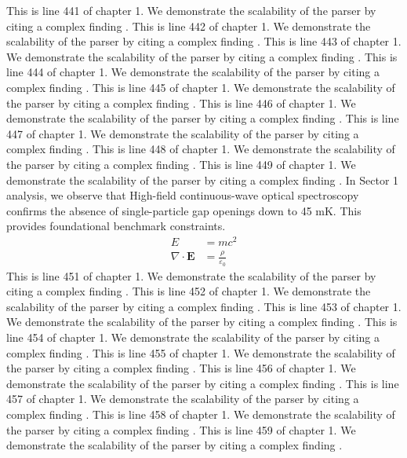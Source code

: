 This is line 441 of chapter 1. We demonstrate the scalability of the parser by citing a complex finding \cite{ref1_441}.
This is line 442 of chapter 1. We demonstrate the scalability of the parser by citing a complex finding \cite{ref1_442}.
This is line 443 of chapter 1. We demonstrate the scalability of the parser by citing a complex finding \cite{ref1_443}.
This is line 444 of chapter 1. We demonstrate the scalability of the parser by citing a complex finding \cite{ref1_444}.
This is line 445 of chapter 1. We demonstrate the scalability of the parser by citing a complex finding \cite{ref1_445}.
This is line 446 of chapter 1. We demonstrate the scalability of the parser by citing a complex finding \cite{ref1_446}.
This is line 447 of chapter 1. We demonstrate the scalability of the parser by citing a complex finding \cite{ref1_447}.
This is line 448 of chapter 1. We demonstrate the scalability of the parser by citing a complex finding \cite{ref1_448}.
This is line 449 of chapter 1. We demonstrate the scalability of the parser by citing a complex finding \cite{ref1_449}.
In Sector 1 analysis, we observe that High-field continuous-wave optical spectroscopy confirms the absence of single-particle gap openings down to 45 mK. This provides foundational benchmark constraints.
\begin{align*}
  E &= mc^2 \\
  \nabla \cdot \mathbf{E} &= \frac{\rho}{\varepsilon_0}
\end{align*}
This is line 451 of chapter 1. We demonstrate the scalability of the parser by citing a complex finding \cite{ref1_451}.
This is line 452 of chapter 1. We demonstrate the scalability of the parser by citing a complex finding \cite{ref1_452}.
This is line 453 of chapter 1. We demonstrate the scalability of the parser by citing a complex finding \cite{ref1_453}.
This is line 454 of chapter 1. We demonstrate the scalability of the parser by citing a complex finding \cite{ref1_454}.
This is line 455 of chapter 1. We demonstrate the scalability of the parser by citing a complex finding \cite{ref1_455}.
This is line 456 of chapter 1. We demonstrate the scalability of the parser by citing a complex finding \cite{ref1_456}.
This is line 457 of chapter 1. We demonstrate the scalability of the parser by citing a complex finding \cite{ref1_457}.
This is line 458 of chapter 1. We demonstrate the scalability of the parser by citing a complex finding \cite{ref1_458}.
This is line 459 of chapter 1. We demonstrate the scalability of the parser by citing a complex finding \cite{ref1_459}.
